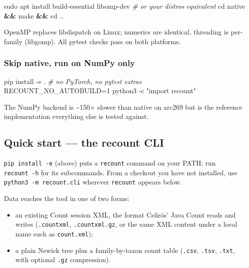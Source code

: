 \documentclass[
  10pt,
]{article}
\newenvironment{Shaded}{}{}
\newcommand{\AttributeTok}[1]{\textcolor[rgb]{0.49,0.56,0.16}{#1}}
\newcommand{\BuiltInTok}[1]{\textcolor[rgb]{0.00,0.50,0.00}{#1}}
\newcommand{\CommentTok}[1]{\textcolor[rgb]{0.38,0.63,0.69}{\textit{#1}}}
\newcommand{\ExtensionTok}[1]{#1}
\newcommand{\FunctionTok}[1]{\textcolor[rgb]{0.02,0.16,0.49}{#1}}
\newcommand{\KeywordTok}[1]{\textcolor[rgb]{0.00,0.44,0.13}{\textbf{#1}}}
\newcommand{\NormalTok}[1]{#1}
\newcommand{\OperatorTok}[1]{\textcolor[rgb]{0.40,0.40,0.40}{#1}}
\newcommand{\StringTok}[1]{\textcolor[rgb]{0.25,0.44,0.63}{#1}}
\newcommand{\VariableTok}[1]{\textcolor[rgb]{0.10,0.09,0.49}{#1}}
\providecommand{\tightlist}{%
  \setlength{\itemsep}{0pt}\setlength{\parskip}{0pt}}
\begin{document}
\begin{Shaded}
\begin{Highlighting}[]
\FunctionTok{sudo}\NormalTok{ apt install build{-}essential libomp{-}dev      }\CommentTok{\# or your distro\textquotesingle{}s equivalent}
\BuiltInTok{cd}\NormalTok{ native }\KeywordTok{\&\&} \FunctionTok{make} \KeywordTok{\&\&} \BuiltInTok{cd}\NormalTok{ ..}
\end{Highlighting}
\end{Shaded}

OpenMP replaces libdispatch on Linux; numerics are identical, threading
is per-family (libgomp). All pytest checks pass on both platforms.

\subsubsection{Skip native, run on NumPy
only}\label{skip-native-run-on-numpy-only}

\begin{Shaded}
\begin{Highlighting}[]
\ExtensionTok{pip}\NormalTok{ install }\AttributeTok{{-}e}\NormalTok{ .                           }\CommentTok{\# no PyTorch, no pytest extras}
\VariableTok{RECOUNT\_NO\_AUTOBUILD}\OperatorTok{=}\NormalTok{1 }\ExtensionTok{python3} \AttributeTok{{-}c} \StringTok{"import recount"}
\end{Highlighting}
\end{Shaded}

The NumPy backend is \textasciitilde150× slower than native on arc269
but is the reference implementation everything else is tested against.

\subsection{Quick start --- the recount
CLI}\label{quick-start--the-recount-cli}

\texttt{pip\ install\ -e} (above) puts a \texttt{recount} command on
your PATH; run \texttt{recount\ -h} for its subcommands. From a checkout
you have not installed, use \texttt{python3\ -m\ recount.cli} wherever
\texttt{recount} appears below.

Data reaches the tool in one of two forms:

\begin{itemize}
\tightlist
\item
  an existing Count session XML, the format Csűrös' Java Count reads and
  writes (\texttt{.countxml}, \texttt{.countxml.gz}, or the same XML
  content under a local name such as \texttt{count.xml});
\item
  a plain Newick tree plus a family-by-taxon count table (\texttt{.csv},
  \texttt{.tsv}, \texttt{.txt}, with optional \texttt{.gz} compression).
\end{itemize}
\end{document}
